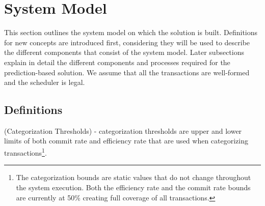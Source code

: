 \section{System Model}
\label{pbs:system_model}
This section outlines the system model on which the solution is built. Definitions for new concepts are introduced first, considering they will be used to describe the different components that consist of the system model. Later subsections explain in detail the different components and processes required for the prediction-based solution. We assume that all the transactions are well-formed and the scheduler is legal.

\subsection{Definitions}
\label{pbs:definitions}


\begin{definition}
\label{cat_bounds}
 (Categorization Thresholds) - categorization thresholds are upper and lower limits of both commit rate and efficiency rate that are used when categorizing transactions\footnote{The categorization bounds are static values that do not change throughout the system execution. Both the efficiency rate and the commit rate bounds are currently at 50\% creating full coverage of all transactions.}.
\end{definition}


